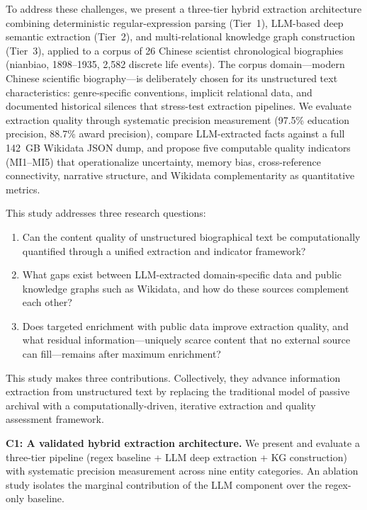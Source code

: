 \documentclass[review]{elsarticle}
\begin{document}
To address these challenges, we present a three-tier hybrid extraction architecture combining deterministic regular-expression parsing (Tier~1), LLM-based deep semantic extraction (Tier~2), and multi-relational knowledge graph construction (Tier~3), applied to a corpus of 26 Chinese scientist chronological biographies (nianbiao, 1898–1935, 2,582 discrete life events). The corpus domain—modern Chinese scientific biography—is deliberately chosen for its unstructured text characteristics: genre-specific conventions, implicit relational data, and documented historical silences that stress-test extraction pipelines. We evaluate extraction quality through systematic precision measurement (97.5\% education precision, 88.7\% award precision), compare LLM-extracted facts against a full 142~GB Wikidata JSON dump, and propose five computable quality indicators (MI1--MI5) that operationalize uncertainty, memory bias, cross-reference connectivity, narrative structure, and Wikidata complementarity as quantitative metrics.

This study addresses three research questions:

\begin{enumerate}[label=RQ\arabic*:,leftmargin=*]
    \item Can the content quality of unstructured biographical text be computationally quantified through a unified extraction and indicator framework?
    \item What gaps exist between LLM-extracted domain-specific data and public knowledge graphs such as Wikidata, and how do these sources complement each other?
    \item Does targeted enrichment with public data improve extraction quality, and what residual information—uniquely scarce content that no external source can fill—remains after maximum enrichment?
\end{enumerate}

This study makes three contributions. Collectively, they advance information extraction from unstructured text by replacing the traditional model of passive archival with a computationally-driven, iterative extraction and quality assessment framework.

\textbf{C1: A validated hybrid extraction architecture.} We present and evaluate a three-tier pipeline (regex baseline + LLM deep extraction + KG construction) with systematic precision measurement across nine entity categories. An ablation study isolates the marginal contribution of the LLM component over the regex-only baseline.
\end{document}
